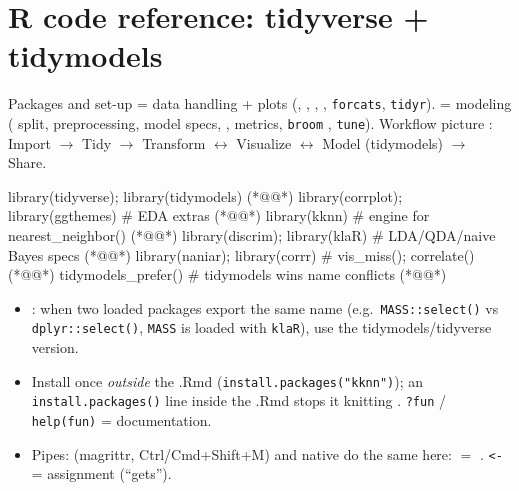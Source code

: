 \section{R code reference: tidyverse + tidymodels}

\begin{topic}{Packages and set-up }
 = data handling + plots (, , , , \texttt{forcats}, \texttt{tidyr}).
 = modeling ( split,  preprocessing,  model specs,
,  metrics, \texttt{broom} , \texttt{tune}).
Workflow picture : Import $\to$ Tidy $\to$ Transform $\leftrightarrow$ Visualize $\leftrightarrow$ Model (tidymodels) $\to$ Share.
\begin{rcode}
library(tidyverse); library(tidymodels)  (*@@*)
library(corrplot); library(ggthemes)     # EDA extras (*@@*)
library(kknn)                  # engine for nearest_neighbor() (*@@*)
library(discrim); library(klaR) # LDA/QDA/naive Bayes specs (*@@*)
library(naniar); library(corrr) # vis_miss(); correlate() (*@@*)
tidymodels_prefer()  # tidymodels wins name conflicts  (*@@*)
\end{rcode}
\begin{itemize}
\item {}: when two loaded packages export the same name (e.g.\ \texttt{MASS::select()} vs
  \texttt{dplyr::select()}, \texttt{MASS} is loaded with \texttt{klaR}), use the tidymodels/tidyverse version.
\item Install once \emph{outside} the .Rmd (\texttt{install.packages("kknn")}); an \texttt{install.packages()} line
  inside the .Rmd stops it knitting . \texttt{?fun} / \texttt{help(fun)} = documentation.
\item Pipes: \ixc{\%>\%} (magrittr, Ctrl/Cmd+Shift+M) and native \ixc{|>} do the same here:
   $=$ . \texttt{<-} = assignment (``gets'').
\end{itemize}
\end{topic}

